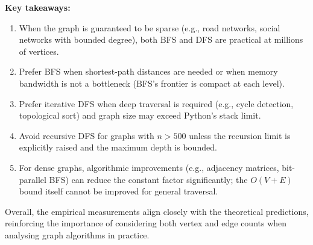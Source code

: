 \textbf{Key takeaways:}
\begin{enumerate}
    \item When the graph is guaranteed to be sparse (e.g., road networks, social networks with bounded degree), both BFS and DFS are practical at millions of vertices.
    \item Prefer BFS when shortest-path distances are needed or when memory bandwidth is not a bottleneck (BFS's frontier is compact at each level).
    \item Prefer iterative DFS when deep traversal is required (e.g., cycle detection, topological sort) and graph size may exceed Python's stack limit.
    \item Avoid recursive DFS for graphs with $n > 500$ unless the recursion limit is explicitly raised and the maximum depth is bounded.
    \item For dense graphs, algorithmic improvements (e.g., adjacency matrices, bit-parallel BFS) can reduce the constant factor significantly; the $O(V + E)$ bound itself cannot be improved for general traversal.
\end{enumerate}

Overall, the empirical measurements align closely with the theoretical predictions, reinforcing the importance of considering both vertex and edge counts when analysing graph algorithms in practice.
